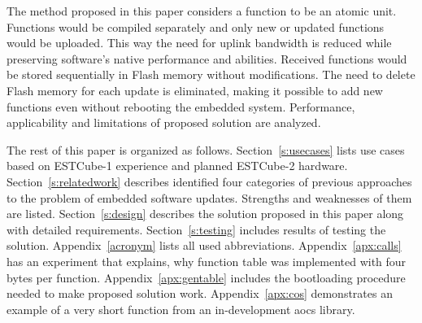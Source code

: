 The method proposed in this paper considers a function to be an atomic unit. Functions would be compiled separately and only new or updated functions would be uploaded.  This way the need for uplink bandwidth is reduced while preserving software's native performance and abilities. Received functions would be stored sequentially in Flash memory without modifications. The need to delete Flash memory for each update is eliminated, making it possible to add new functions even without rebooting the embedded system. Performance, applicability and limitations of proposed solution are analyzed.

The rest of this paper is organized as follows. Section~\ref{s:usecases} lists use cases based on ESTCube-1 experience and planned ESTCube-2 hardware. Section~\ref{s:relatedwork} describes identified four categories of previous approaches to the problem of embedded software updates. Strengths and weaknesses of them are listed. Section~\ref{s:design} describes the solution proposed in this paper along with detailed requirements. Section~\ref{s:testing} includes results of testing the solution. Appendix~\ref{acronym} lists all used abbreviations. Appendix~\ref{apx:calls} has an experiment that explains, why function table was implemented with four bytes per function. Appendix~\ref{apx:gentable} includes the bootloading procedure needed to make proposed solution work. Appendix~\ref{apx:cos} demonstrates an example of a very short function from an in-development \gls{aocs} library.
